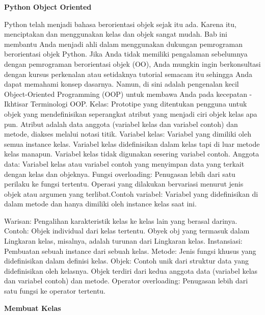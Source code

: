 \sloppy
\begin{center}{\fontsize{16pt}{16pt}\selectfont \textbf{Python Object Oriented} \\}\end{center} \par
Python telah menjadi bahasa berorientasi objek sejak itu ada. Karena itu, menciptakan dan menggunakan kelas dan objek sangat mudah. Bab ini membantu Anda menjadi ahli dalam menggunakan dukungan pemrograman berorientasi objek Python. Jika Anda tidak memiliki pengalaman sebelumnya dengan pemrograman berorientasi objek (OO), Anda mungkin ingin berkonsultasi dengan kursus perkenalan atau setidaknya tutorial semacam itu sehingga Anda dapat memahami konsep dasarnya. Namun, di sini adalah pengenalan kecil Object-Oriented Programming (OOP) untuk membawa Anda pada kecepatan - Ikhtisar Terminologi OOP. Kelas: Prototipe yang ditentukan pengguna untuk objek yang mendefinisikan seperangkat atribut yang menjadi ciri objek kelas apa pun. Atribut adalah data anggota (variabel kelas dan variabel contoh) dan metode, diakses melalui notasi titik. Variabel kelas: Variabel yang dimiliki oleh semua instance kelas. Variabel kelas didefinisikan dalam kelas tapi di luar metode kelas manapun. Variabel kelas tidak digunakan sesering variabel contoh. Anggota data: Variabel kelas atau variabel contoh yang menyimpan data yang terkait dengan kelas dan objeknya. Fungsi overloading: Penugasan lebih dari satu perilaku ke fungsi tertentu. Operasi yang dilakukan bervariasi menurut jenis objek atau argumen yang terlibat.Contoh variabel: Variabel yang didefinisikan di dalam metode dan hanya dimiliki oleh instance kelas saat ini. \par
Warisan: Pengalihan karakteristik kelas ke kelas lain yang berasal darinya. Contoh: Objek individual dari kelas tertentu. Obyek obj yang termasuk dalam Lingkaran kelas, misalnya, adalah turunan dari Lingkaran kelas. Instansiasi: Pembuatan sebuah instance dari sebuah kelas. Metode: Jenis fungsi khusus yang didefinisikan dalam definisi kelas.  Objek: Contoh unik dari struktur data yang didefinisikan oleh kelasnya. Objek terdiri dari kedua anggota data (variabel kelas dan variabel contoh) dan metode. Operator overloading: Penugasan lebih dari satu fungsi ke operator tertentu. \par
\vspace{12pt}
\noindent 
{\fontsize{14pt}{14pt}\selectfont \textbf{Membuat Kelas} \\} \par
\vspace{12pt}
